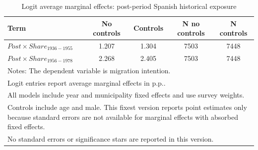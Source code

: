 \begin{table}[!htbp]
\centering
\caption{Logit average marginal effects: post-period Spanish historical exposure}
\label{tab:logit_post_share_mfx}
\small
\begin{tabular}{lcccc}
\hline
Term & No controls & Controls & N no controls & N controls \\
\hline
$Post \times Share_{1936-1955}$ & 1.207 & 1.304 & 7503 & 7448 \\
$Post \times Share_{1956-1978}$ & 2.268 & 2.405 & 7503 & 7448 \\
\hline
\multicolumn{5}{l}{\footnotesize Notes: The dependent variable is migration intention.} \\
\multicolumn{5}{l}{\footnotesize Logit entries report average marginal effects in p.p..} \\
\multicolumn{5}{l}{\footnotesize All models include year and municipality fixed effects and use survey weights.} \\
\multicolumn{5}{l}{\footnotesize Controls include age and male. This fixest version reports point estimates only because standard errors are not available for marginal effects with absorbed fixed effects.} \\
\multicolumn{5}{l}{\footnotesize No standard errors or significance stars are reported in this version.} \\
\end{tabular}
\end{table}
